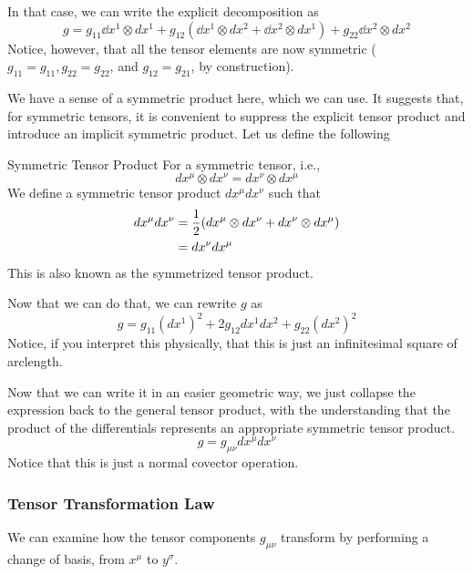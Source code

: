 	In that case, we can write the explicit decomposition as
	\[
		g = 
		g_{11} \dd{x}^1 \otimes dx^1 +
		g_{12} (\dd{x}^1 \otimes dx^2 +
		\dd{x}^2 \otimes dx^1) +
		g_{22} \dd{x}^2 \otimes dx^2
	\]
	Notice, however, that all the tensor elements are now symmetric ($g_{11}=g_{11}, g_{22}=g_{22}$, and $g_{12}=g_{21}$, by construction).

	We have a sense of a symmetric product here, which we can use. It suggests that,
	for symmetric tensors, it is convenient to suppress the explicit tensor product
	and introduce an implicit symmetric product. Let us define the following

	\begin{definition}{Symmetric Tensor Product}
		For a symmetric tensor, i.e.,
		\[
			dx^{\mu}\otimes dx^\nu = dx^\nu \otimes dx^\mu
		\]
		We define a symmetric tensor product $dx^\mu dx^\nu$ such that
		\begin{align*}
			dx^{\mu}dx^{\nu} &= 
			\frac{1}{2}\pqty{
				dx^{\mu}\otimes dx^\nu + dx^\nu \otimes dx^\mu
			}\\
							 &= dx^\nu dx^\mu
		\end{align*} 
		This is also known as the symmetrized tensor product.
	\end{definition}

	Now that we can do that, we can rewrite $g$ as 
	\[
		g = g_{11}(dx^1)^2 + 2g_{12} dx^1 dx^2 + g_{22} (dx^2)^2
	\]
	Notice, if you interpret this physically, that 
	this is just an infinitesimal square of arclength.

	Now that we can write it in an easier geometric way, we just collapse the expression back to
	the general tensor product, with the understanding that the product of the differentials
	represents an appropriate symmetric tensor product.
	\[
		g = g_{\mu\nu} dx^\mu dx^\nu
	\]
	Notice that this is just a normal covector operation.
\subsubsection{Tensor Transformation Law}
	We can examine
	how the tensor components $g_{\mu\nu}$ transform by performing a change 
	of basis, from $x^\mu$ to $y^\sigma$. 

